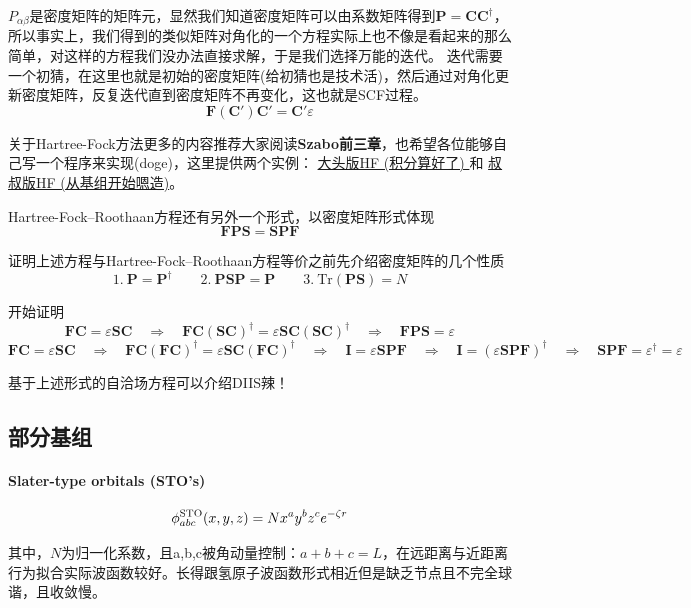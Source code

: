 $P_{\alpha\beta}$是密度矩阵的矩阵元，显然我们知道密度矩阵可以由系数矩阵得到$\mathbf{P}=\mathbf{C}\mathbf{C}^{\dagger}$，所以事实上，我们得到的类似矩阵对角化的一个方程实际上也不像是看起来的那么简单，对这样的方程我们没办法直接求解，于是我们选择万能的迭代。
迭代需要一个初猜，在这里也就是初始的密度矩阵(给初猜也是技术活)，然后通过对角化更新密度矩阵，反复迭代直到密度矩阵不再变化，这也就是SCF过程。
\[\mathbf{F}(\mathbf{C}')\mathbf{C}'=\mathbf{C}'\varepsilon\]

关于Hartree-Fock方法更多的内容推荐大家阅读\textbf{Szabo前三章}，也希望各位能够自己写一个程序来实现(doge)，这里提供两个实例：
\href{https://github.com/yangdatou/hf-tutorial}{大头版HF (积分算好了) }和
\href{https://github.com/Walter-Feng/Hartree-Fock-in-CPP}{叔叔版HF (从基组开始嗯造)}。

Hartree-Fock–Roothaan方程还有另外一个形式，以密度矩阵形式体现
\[\mathbf{F}\mathbf{P}\mathbf{S}=\mathbf{S}\mathbf{P}\mathbf{F}\]

证明上述方程与Hartree-Fock–Roothaan方程等价之前先介绍密度矩阵的几个性质
\[1. \ \mathbf{P}=\mathbf{P}^{\dagger} \qquad 2. \ \mathbf{P}\mathbf{S}\mathbf{P}=\mathbf{P} \qquad 3.\ \text{Tr}(\mathbf{P}\mathbf{S})=N\]

开始证明
\[\mathbf{F}\mathbf{C}=\varepsilon\mathbf{S}\mathbf{C} \quad \Rightarrow \quad \mathbf{F}\mathbf{C}(\mathbf{S}\mathbf{C})^{\dagger}=\varepsilon\mathbf{S}\mathbf{C}(\mathbf{S}\mathbf{C})^{\dagger} \quad \Rightarrow \quad \mathbf{F}\mathbf{P}\mathbf{S}=\varepsilon\]
\[\mathbf{F}\mathbf{C}=\varepsilon\mathbf{S}\mathbf{C} \quad \Rightarrow \quad \mathbf{F}\mathbf{C}(\mathbf{F}\mathbf{C})^{\dagger}=\varepsilon\mathbf{S}\mathbf{C}(\mathbf{F}\mathbf{C})^{\dagger} \quad \Rightarrow \quad \mathbf{I}=\varepsilon\mathbf{S}\mathbf{P}\mathbf{F} \quad \Rightarrow \quad \mathbf{I}=(\varepsilon\mathbf{S}\mathbf{P}\mathbf{F})^{\dagger} \quad \Rightarrow \quad \mathbf{S}\mathbf{P}\mathbf{F}=\varepsilon^{\dagger}=\varepsilon\]

基于上述形式的自洽场方程可以介绍DIIS辣！


\subsection{部分基组}
\paragraph*{Slater-type orbitals (STO's)}
\[\phi_{abc}^{\rm{STO}}(x,y,z)=Nx^ay^bz^ce^{-\zeta r}\]

其中，$N$为归一化系数，且a,b,c被角动量控制：$a+b+c=L$，在远距离与近距离行为拟合实际波函数较好。长得跟氢原子波函数形式相近但是缺乏节点且不完全球谐，且收敛慢。

